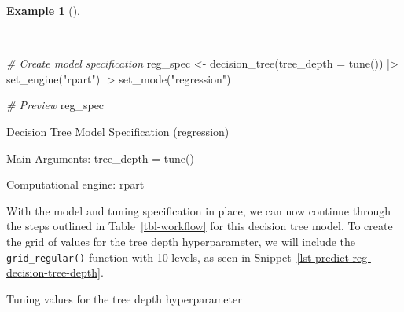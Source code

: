 \documentclass[
  letterpaper,
]{book}
\newenvironment{Shaded}{\begin{snugshade}}{\end{snugshade}}
\newcommand{\AttributeTok}[1]{\textcolor[rgb]{0.00,0.00,0.00}{#1}}
\newcommand{\CommentTok}[1]{\textcolor[rgb]{0.00,0.00,0.00}{\textit{#1}}}
\newcommand{\DecValTok}[1]{\textcolor[rgb]{0.00,0.00,0.00}{#1}}
\newcommand{\FunctionTok}[1]{\textcolor[rgb]{0.00,0.00,0.00}{#1}}
\newcommand{\NormalTok}[1]{\textcolor[rgb]{0.00,0.00,0.00}{#1}}
\newcommand{\OtherTok}[1]{\textcolor[rgb]{0.00,0.00,0.00}{#1}}
\newcommand{\SpecialCharTok}[1]{\textcolor[rgb]{0.00,0.00,0.00}{#1}}
\newcommand{\StringTok}[1]{\textcolor[rgb]{0.00,0.00,0.00}{#1}}
\theoremstyle{definition}
\newtheorem{example}{Example}[chapter]
\theoremstyle{remark}
\begin{document}
\begin{example}[]\protect\hypertarget{exm-predict-reg-model-spec-decision-tree}{}\label{exm-predict-reg-model-spec-decision-tree}

~

\begin{Shaded}
\begin{Highlighting}[]
\CommentTok{\# Create model specification}
\NormalTok{reg\_spec }\OtherTok{\textless{}{-}}
  \FunctionTok{decision\_tree}\NormalTok{(}\AttributeTok{tree\_depth =} \FunctionTok{tune}\NormalTok{()) }\SpecialCharTok{|\textgreater{}}
  \FunctionTok{set\_engine}\NormalTok{(}\StringTok{"rpart"}\NormalTok{) }\SpecialCharTok{|\textgreater{}}
  \FunctionTok{set\_mode}\NormalTok{(}\StringTok{"regression"}\NormalTok{)}

\CommentTok{\# Preview}
\NormalTok{reg\_spec}
\end{Highlighting}
\end{Shaded}

\begin{Shaded}
\begin{Highlighting}[]
\NormalTok{Decision Tree Model Specification (regression)}

\NormalTok{Main Arguments:}
\NormalTok{  tree\_depth = tune()}

\NormalTok{Computational engine: rpart}
\end{Highlighting}
\end{Shaded}

\end{example}

With the model and tuning specification in place, we can now continue
through the steps outlined in Table~\ref{tbl-workflow} for this decision
tree model. To create the grid of values for the tree depth
hyperparameter, we will include the \texttt{grid\_regular()} function
with 10 levels, as seen in
Snippet~\ref{lst-predict-reg-decision-tree-depth}.

\begin{codelisting}

\caption{\label{lst-predict-reg-decision-tree-depth}Tuning values for
the tree depth hyperparameter}

\centering{

\begin{Shaded}
\begin{Highlighting}[]
\NormalTok{reg\_grid }\OtherTok{\textless{}{-}}
  \FunctionTok{grid\_regular}\NormalTok{(}\FunctionTok{tree\_depth}\NormalTok{(), }\AttributeTok{levels =} \DecValTok{10}\NormalTok{)}
\end{Highlighting}
\end{Shaded}

}

\end{codelisting}%
\end{document}
